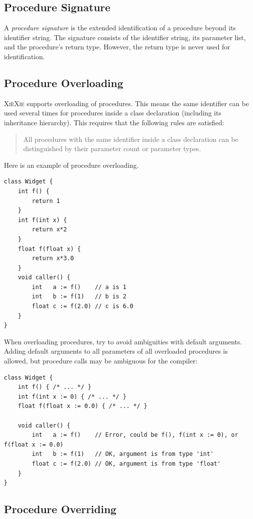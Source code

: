 \documentclass[a5paper]{report}
\def\xiexie{\textsc{Xi\`eXie}\xspace}
\begin{document}
\subsection{Procedure Signature}

A \textit{procedure signature} is the extended identification of a procedure beyond its identifier string.
The signature consists of the identifier string, its parameter list, and the procedure's return type.
However, the return type is never used for identification.

\subsection{Procedure Overloading}

\xiexie supports overloading of procedures. This means the same identifier can be used several times
for procedures inside a class declaration (including its inheritance hierarchy).
This requires that the following rules are satisfied:
\begin{quote}
	All procedures with the same identifier inside a class declaration can be distinguished by their
	parameter count or parameter types.
\end{quote}
Here is an example of procedure overloading.
\begin{lstlisting}
class Widget {
    int f() {
        return 1
    }
    int f(int x) {
        return x*2
    }
    float f(float x) {
        return x*3.0
    }
    void caller() {
        int   a := f()    // a is 1
        int   b := f(1)   // b is 2
        float c := f(2.0) // c is 6.0
    }
}
\end{lstlisting}
When overloading procedures, try to avoid ambiguities with default arguments. Adding default arguments
to all parameters of all overloaded procedures is allowed, but procedure calls may be ambiguous for the compiler:
\begin{lstlisting}
class Widget {
    int f() { /* ... */ }
    int f(int x := 0) { /* ... */ }
    float f(float x := 0.0) { /* ... */ }
    
    void caller() {
        int   a := f()    // Error, could be f(), f(int x := 0), or f(float x := 0.0)
        int   b := f(1)   // OK, argument is from type 'int'
        float c := f(2.0) // OK, argument is from type 'float'
    }
}
\end{lstlisting}

\subsection{Procedure Overriding}
\end{document}

